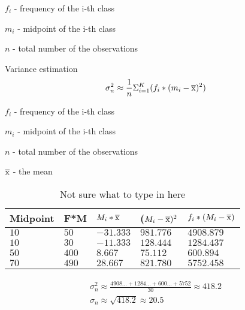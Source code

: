 \documentclass{article}
\begin{document}
$f_i$ - frequency of the i-th class

$m_i$ - midpoint of the i-th class

$n$ - total number of the observations

Variance estimation
\begin{equation}
  \sigma^2_n \approx \frac{1}{n}\Sigma^K_{i=1}(f_i * (m_i - \overline{\rm x})^2)
\end{equation}

$f_i$ - frequency of the i-th class

$m_i$ - midpoint of the i-th class

$n$ - total number of the observations

$\overline{\rm x}$ - the mean

\begin{table}[htbp]
  \centering
  \begin{tabular}{|l|l|l|l|l|}
    \hline
    \textbf{Midpoint} & \textbf{F*M} & \textbf{$M_i * \overline{\rm x}$} & \textbf{($M_i - \overline{\rm x})^2$} & \textbf{$f_i * (M_i - \overline{\rm x})$} \\
    \hline
    $10$ & $50$ & $-31.333$ & $981.776$ & $4908.879$ \\
    \hline
    $10$ & $30$ & $-11.333$ & $128.444$ & $1284.437$ \\
    \hline
    $50$ & $400$ & $8.667$ & $75.112$ & $600.894$ \\
    \hline
    $70$ & $490$ & $28.667$ & $821.780$ & $5752.458$  \\
    \hline
  \end{tabular}
  \caption{Not sure what to type in here}
  \label{tab:estimating_a_mean_and_variance_3}
\end{table}
\begin{equation}
  \begin{gathered}
    \sigma^2_n \approx \frac{4908... + 1284... + 600... + 5752}{30} \approx 418.2  \\
    \sigma_n \approx \sqrt{418.2} \approx 20.5
  \end{gathered}
\end{equation}
\end{document}
